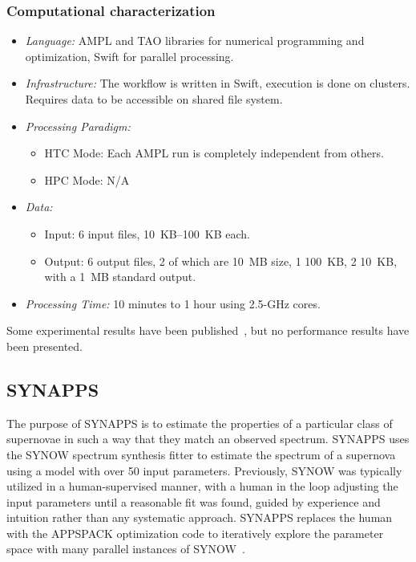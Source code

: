 \documentclass[10pt,letterpaper]{article}
\begin{document}
\subsubsection{Computational characterization}
\begin {itemize}
\item {\em Language:} AMPL and TAO libraries for numerical programming and optimization, Swift for parallel processing.
\item {\em Infrastructure:} The workflow is written in Swift, execution is done  on clusters.  Requires data to be accessible on shared file system.
\item {\em Processing Paradigm:}
  \begin{itemize}
  \item HTC Mode: Each AMPL run is completely independent from others.
  \item HPC Mode: N/A
  \end{itemize}

\item {\em Data:}
  \begin{itemize}
  \item Input: 6 input files, 10~KB--100~KB each.
  \item Output: 6 output files, 2 of which are 10~MB size, 1 100~KB, 2 10~KB, with a 1~MB standard output.
  \end{itemize}

\item {\em Processing Time:} 10 minutes to 1 hour using 2.5-GHz cores.
\end{itemize}

Some experimental results have been published~\cite{CIM-EARTH-10}, but no performance results have been presented.


\subsection{SYNAPPS}

The purpose of SYNAPPS is to estimate the properties of a particular class of supernovae in such
a way that they match an observed spectrum. SYNAPPS uses the SYNOW spectrum synthesis fitter to
estimate the spectrum of a supernova using a model with over 50 input parameters.  Previously,
SYNOW was typically utilized in a human-supervised manner, with a human in the loop adjusting
the input
parameters until a reasonable fit was found, guided by experience and intuition rather than
any systematic approach.  SYNAPPS replaces the human with the APPSPACK optimization code to
iteratively explore the parameter space with many parallel instances of SYNOW~\cite{nugent-synapps-08}.
\end{document}
